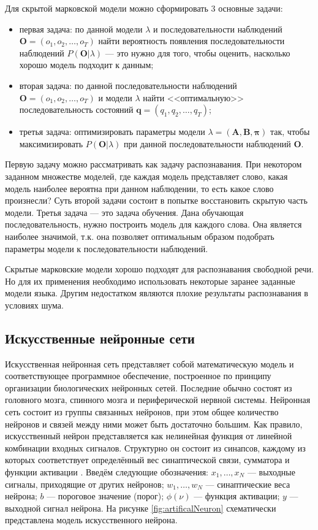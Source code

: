 Для скрытой марковской модели можно сформировать 3 основные задачи:
\begin{itemize}
	\item первая задача: по данной модели $\lambda$ и последовательности наблюдений $\pmb{O} = (o_1, o_2, \dots, o_T)$ найти вероятность появления последовательности наблюдений $P(\pmb{O}|\lambda)$ --- это нужно для того, чтобы оценить, насколько хорошо модель подходит к данным;
	\item вторая задача: по данной последовательности наблюдений $\pmb{O} = (o_1, o_2, \dots, o_T)$ и модели $\lambda$ найти <<оптимальную>> последовательность состояний $\pmb{q} = (q_1, q_2, \dots, q_T)$;
	\item третья задача: оптимизировать параметры модели $\lambda = (\pmb{A}, \pmb{B}, \pmb{\pi})$ так, чтобы максимизировать $P(\pmb{O} | \lambda)$ при данной последовательности наблюдений $\pmb{O}$.
\end{itemize}

Первую задачу можно рассматривать как задачу распознавания.
При некотором заданном множестве моделей, где каждая модель представляет слово, какая модель наиболее вероятна при данном наблюдении, то есть какое слово произнесли?
Суть второй задачи состоит в попытке восстановить скрытую часть модели.
Третья задача --- это задача обучения.
Дана обучающая последовательность, нужно построить модель для каждого слова.
Она является наиболее значимой, т.к. она позволяет оптимальным образом подобрать параметры модели к последовательности наблюдений.

Скрытые марковские модели хорошо подходят для распознавания свободной речи.
Но для их применения необходимо использовать некоторые заранее заданные модели языка.
Другим недостатком являются плохие результаты распознавания в условиях шума.


\subsection{Искусственные нейронные сети} \label{sect1_3_3}

Искусственная нейронная сеть представляет собой математическую модель и соответствующее программное обеспечение, построенное по принципу организации биологических нейронных сетей.
Последние обычно состоят из головного мозга, спинного мозга и периферической нервной системы.
Нейронная сеть состоит из группы связанных нейронов, при этом общее количество нейронов и связей между ними может быть достаточно большим.
Как правило, искусственный нейрон представляется как нелинейная функция от линейной комбинации входных сигналов.
Структурно он состоит из синапсов, каждому из которых соответствует определённый вес синаптической связи, сумматора и функции активации \cite{haykin2008neuron}.
Введём следующие обозначения: $x_1, \dots, x_N$ --- выходные сигналы, приходящие от других нейронов; $w_1, \dots, w_N$ --- синаптические веса нейрона; $b$ --- пороговое значение (порог); $\phi(\nu)$ --- функция активации; $y$ --- выходной сигнал нейрона.
На рисунке \ref{fig:artificalNeuron} схематически представлена модель искусственного нейрона. 

